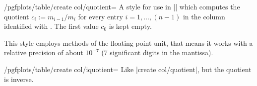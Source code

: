 \begin{stylekey}{/pgfplots/table/create col/quotient=}
    A style for use in |\pgfplotstablecreatecol| which computes the quotient
    $c_i := m_{i-1} / m_i$ for every entry $i = 1,\dotsc, (n-1)$ in the column
    identified with . The first value $c_0$ is kept empty.
\begin{codeexample}[pre={\begin{lateximage}},post={\end{lateximage}}]

\end{codeexample}
    This style employs methods of the floating point unit, that means it works
    with a relative precision of about $10^{-7}$ ($7$ significant digits in the
    mantissa).
\end{stylekey}

\begin{stylekey}{/pgfplots/table/create col/iquotient=}
    Like |create col/quotient|, but the quotient is inverse.
\end{stylekey}

